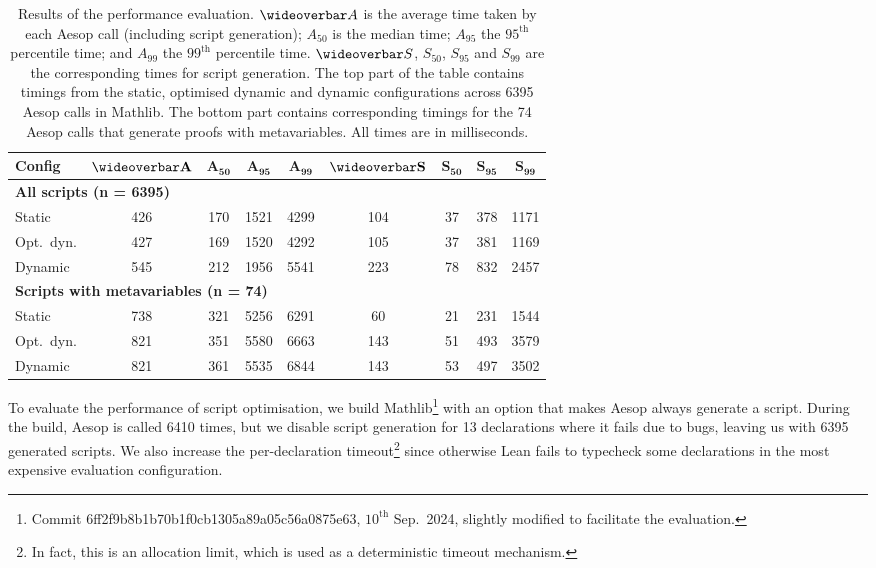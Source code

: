 \begin{table}
  \centering
  \small
  \begin{tabular}{lcccc|cccc}
    \textbf{Config} & $\mean{\mathbf{A}}$ & $\mathbf{A_{50}}$ & $\mathbf{A_{95}}$ & $\mathbf{A_{99}}$ & $\mean{\mathbf{S}}$ & $\mathbf{S_{50}}$ & $\mathbf{S_{95}}$ & $\mathbf{S_{99}}$ \\
    \midrule
    \multicolumn{9}{l}{\textbf{All scripts (n = 6395)}} \\
    Static     & 426 & 170 & 1521 & 4299 & 104 & 37 & 378 & 1171 \\
    Opt.\ dyn. & 427 & 169 & 1520 & 4292 & 105 & 37 & 381 & 1169 \\
    Dynamic    & 545 & 212 & 1956 & 5541 & 223 & 78 & 832 & 2457 \\
    \midrule
    \multicolumn{9}{l}{\textbf{Scripts with metavariables (n = 74)}} \\
    Static     & 738 & 321 & 5256 & 6291 & 60  & 21 & 231 & 1544 \\
    Opt.\ dyn. & 821 & 351 & 5580 & 6663 & 143 & 51 & 493 & 3579 \\
    Dynamic    & 821 & 361 & 5535 & 6844 & 143 & 53 & 497 & 3502 \\
  \end{tabular}
  \caption{Results of the performance evaluation.
    $\mean{A}$ is the average time taken by each Aesop call (including script generation); $A_{50}$ is the median time; $A_{95}$ the $95^{\mathrm{th}}$ percentile time; and $A_{99}$ the $99^{\mathrm{th}}$ percentile time.
    $\mean{S}$, $S_{50}$, $S_{95}$ and $S_{99}$ are the corresponding times for script generation.
    The top part of the table contains timings from the static, optimised dynamic and dynamic configurations across 6395 Aesop calls in Mathlib.
    The bottom part contains corresponding timings for the 74 Aesop calls that generate proofs with metavariables.
    All times are in milliseconds.}%
  \label{table:evaluation}
\end{table}

To evaluate the performance of script optimisation, we build Mathlib\footnote{Commit 6ff2f9b8b1b70b1f0cb1305a89a05c56a0875e63, $10^{\mathrm{th}}$ Sep.\ 2024, slightly modified to facilitate the evaluation.} with an option that makes Aesop always generate a script.
During the build, Aesop is called 6410 times, but we disable script generation for 13 declarations where it fails due to bugs, leaving us with 6395 generated scripts.
We also increase the per-declaration timeout\footnote{In fact, this is an allocation limit, which is used as a deterministic timeout mechanism.} since otherwise Lean fails to typecheck some declarations in the most expensive evaluation configuration.


